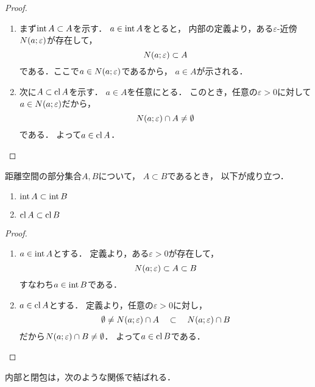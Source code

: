 \documentclass[../sotsu.tex]{subfiles}
\begin{document}
\begin{proof}
    \begin{enumerate}
        \item まず$\operatorname{int}{A} \subset A$を示す．
            $a \in \operatorname{int}{A}$をとると，
            内部の定義より，ある$\varepsilon$-近傍$N(a; \varepsilon)$が存在して，
            \[  N(a; \varepsilon) \subset A  \]
            である．ここで$a \in N(a; \varepsilon)$であるから，
            $a \in A$が示される．
        \item 次に$A \subset \operatorname{cl}{A}$を示す．
            $a \in A$を任意にとる．
            このとき，任意の$\varepsilon > 0$に対して$a \in N(a; \varepsilon)$だから，
            \[ N(a; \varepsilon) \cap A \neq \emptyset \]
            である．
            よって$a \in \operatorname{cl}{A}$．\qedhere
    \end{enumerate}
\end{proof}


\begin{proposition}
    \label{thm:inclusion-for-int-and-cl}
    距離空間の部分集合$A, B$について，
    $A \subset B$であるとき，
    以下が成り立つ．
    \begin{enumerate}
        \item $\operatorname{int}{A} \subset \operatorname{int}{B}$
        \item $\operatorname{cl}{A} \subset \operatorname{cl}{B}$
    \end{enumerate}
\end{proposition}

\begin{proof}
    \begin{enumerate}
        \item $a \in \operatorname{int}{A}$とする．
            定義より，ある$\varepsilon > 0$が存在して，
            \[  N(a; \varepsilon) \subset A \subset B  \]
            すなわち$a \in \operatorname{int}{B}$である．
        \item $a \in \operatorname{cl}{A}$とする．
            定義より，任意の$\varepsilon > 0$に対し，
            \[  \emptyset
                \neq N(a; \varepsilon) \cap A 
                \quad \subset \quad 
                N(a; \varepsilon) \cap B
                  \]
            だから$N(a; \varepsilon) \cap B  \neq  \emptyset$．
            よって$a \in \operatorname{cl}{B}$である．\qedhere
    \end{enumerate}
\end{proof}


内部と閉包は，次のような関係で結ばれる．
\end{document}
